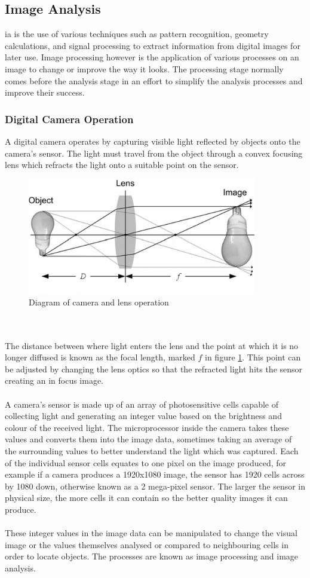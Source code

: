 \subsection{Image Analysis}
	\gls{ia} is the use of various techniques such as pattern recognition, 
	geometry calculations, and signal processing to extract information from 
	digital images for later use. Image processing however is the application 
	of various processes on an image to change or improve the way it looks. The 
	processing stage normally comes before the analysis stage in an effort to 
	simplify the analysis processes and improve their success.
	\subsubsection{Digital Camera Operation}
	A digital camera operates by capturing visible light reflected by objects 
	onto the camera's sensor. The light must travel from the object through a convex focusing lens 
	which refracts the light onto a suitable point on the sensor.
	\begin{figure}[h!]
		\centering
		\includegraphics[width=10cm]{../images/camera_bulb.PNG}
		\caption{Diagram of camera and lens operation}
		\label{fig:camera_diagram}
	\end{figure}
	\\\\
	The distance between where light enters the lens and the point at which it is no longer 
	diffused is known as the focal length, marked $f$ in figure \ref{fig:camera_diagram}. This 
	point can be adjusted by changing the lens optics so that the refracted 
	light hits the sensor creating an in focus image.
	\\\\
	A camera's sensor is made up of an array of photosensitive cells capable of collecting light and generating an integer value based on the brightness and colour of the received light. The microprocessor inside the camera takes these values and converts them into the image data, sometimes taking an average of the surrounding values to better understand the light which was captured. Each of the individual sensor cells equates to one pixel on the image produced, for 
	example if a camera produces a 1920x1080 image, the sensor has 1920 cells across by 1080 down, otherwise known as a 2 mega-pixel sensor. The larger the sensor in physical size, the more cells it can contain so the better quality images it can produce.
	\\\\
	These integer values in the image data can be manipulated to change the 
	visual image or the values themselves analysed or compared to neighbouring 
	cells in order to locate objects. The processes are known as image processing and image analysis.
